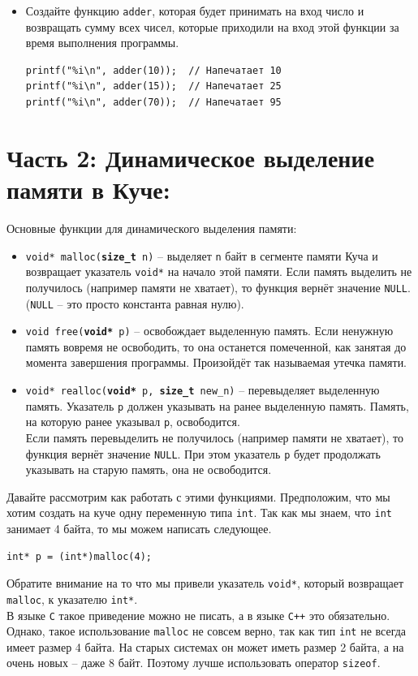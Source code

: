 \documentclass{article}
\begin{document}
\begin{itemize}
\item Создайте функцию \texttt{adder}, которая будет принимать на вход число и возвращать сумму всех чисел, которые приходили на вход этой функции за время выполнения программы.
\begin{lstlisting}
printf("%i\n", adder(10));  // Напечатает 10
printf("%i\n", adder(15));  // Напечатает 25
printf("%i\n", adder(70));  // Напечатает 95
\end{lstlisting}
\end{itemize}



\newpage
\section*{Часть 2: Динамическое выделение памяти в Куче:}
Основные функции для динамического выделения памяти:
\begin{itemize}
\item \texttt{void* malloc(\textbf{size\_t} n)} -- выделяет \texttt{n} байт в сегменте памяти Куча и возвращает указатель \texttt{void*}
на начало этой памяти. Если память выделить не получилось (например памяти не хватает), то функция вернёт значение \texttt{NULL}. (\texttt{NULL} -- это просто константа равная нулю). \\
\item \texttt{void free(\textbf{void*} p)} -- освобождает выделенную память. Если ненужную память вовремя не освободить, то она останется помеченной, как занятая до момента завершения программы. Произойдёт так называемая утечка памяти.\\
\item \texttt{void* realloc(\textbf{void*} p, \textbf{size\_t} new\_n)} -- перевыделяет выделенную память. Указатель \texttt{p} должен указывать на ранее выделенную память. Память, на которую ранее указывал \texttt{p}, освободится. \\
Если память перевыделить не получилось (например памяти не хватает), то функция вернёт значение \texttt{NULL}. При этом указатель \texttt{p} будет продолжать указывать на старую память, она не освободится.\\
\end{itemize}

Давайте рассмотрим как работать с этими функциями. Предположим, что мы хотим создать на куче одну переменную типа \texttt{int}. Так как мы знаем, что \texttt{int} занимает 4 байта, то мы можем написать следующее.
\begin{lstlisting}
int* p = (int*)malloc(4);
\end{lstlisting}
Обратите внимание на то что мы привели указатель \texttt{void*}, который возвращает \texttt{malloc}, к указателю \texttt{int*}.\\
В языке \texttt{C} такое приведение можно не писать, а в языке \texttt{C++} это обязательно. Однако, такое использование \texttt{malloc} не совсем верно, так как тип \texttt{int} не всегда имеет размер 4 байта. На старых системах он может иметь размер 2 байта, а на очень новых -- даже 8 байт. Поэтому лучше использовать оператор \texttt{sizeof}.\\
\end{document}
